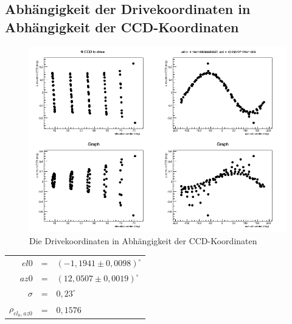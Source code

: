 \subsection{Abhängigkeit der Drivekoordinaten in Abhängigkeit der CCD-Koordinaten}
\begin{figure}[htbp]
\centering
\includegraphics[width=\textwidth]{../341/run341C2D.png}
\caption{Die Drivekoordinaten in Abhängigkeit der CCD-Koordinaten}
\label{img:C2D}
\end{figure}
\begin{table}[htbp]
\centering
\begin{tabular}{rcl}
\toprule
$el0$ &=& $(-1,1941\pm0,0098)^{\circ}$\\
$az0$ &=& $(12,0507\pm0,0019)^{\circ}$\\
$\sigma$ &=& $0,23^{\circ}$\\
$\rho_{el_0,az0}$ &=& $0,1576$\\
\bottomrule
\end{tabular}

\end{table}

